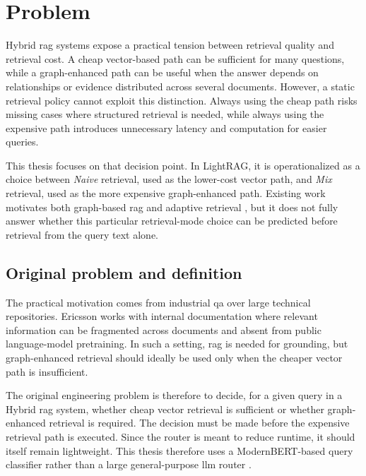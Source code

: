 \documentclass[english, bibtex]{kththesis}               %
\numberwithin{listing}{chapter}
\begin{document}
\section{Problem}
\label{sec:problem}

Hybrid \gls{rag} systems expose a practical tension between retrieval quality and retrieval cost. A cheap vector-based path can be sufficient for many questions, while a graph-enhanced path can be useful when the answer depends on relationships or evidence distributed across several documents. However, a static retrieval policy cannot exploit this distinction. Always using the cheap path risks missing cases where structured retrieval is needed, while always using the expensive path introduces unnecessary latency and computation for easier queries.

This thesis focuses on that decision point. In LightRAG, it is operationalized as a choice between \emph{Naive} retrieval, used as the lower-cost vector path, and \emph{Mix} retrieval, used as the more expensive graph-enhanced path. Existing work motivates both graph-based \gls{rag} and adaptive retrieval \cite{edge2024graphrag,lightrag2024,asai2023selfrag,jeong2024adaptiverag}, but it does not fully answer whether this particular retrieval-mode choice can be predicted before retrieval from the query text alone.

\subsection{Original problem and definition}
\label{sec:researchQuestion}

The practical motivation comes from industrial \gls{qa} over large technical repositories. Ericsson works with internal documentation where relevant information can be fragmented across documents and absent from public language-model pretraining. In such a setting, \gls{rag} is needed for grounding, but graph-enhanced retrieval should ideally be used only when the cheaper vector path is insufficient.

The original engineering problem is therefore to decide, for a given query in a Hybrid \gls{rag} system, whether cheap vector retrieval is sufficient or whether graph-enhanced retrieval is required. The decision must be made before the expensive retrieval path is executed. Since the router is meant to reduce runtime, it should itself remain lightweight. This thesis therefore uses a ModernBERT-based query classifier rather than a large general-purpose \gls{llm} router \cite{benayas2024encoder,warner2024modernbert}.
\end{document}
